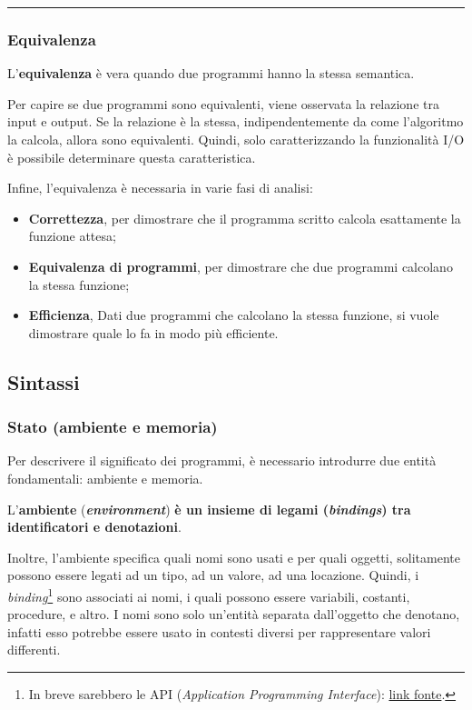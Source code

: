 \documentclass[a4paper]{article}
\newcommand{\longline}{\noindent\rule{\textwidth}{0.4pt}}
\begin{document}
	\longline
	
	\subsubsection{Equivalenza}
	
	\begin{boxdef}
		L'\textcolor{Red3}{\textbf{equivalenza}} è vera quando due programmi hanno la stessa semantica.
	\end{boxdef}
	
	\noindent
	Per capire se due programmi sono equivalenti, viene osservata la relazione tra input e output. Se la relazione è la stessa, indipendentemente da come l'algoritmo la calcola, allora sono equivalenti. Quindi, solo caratterizzando la funzionalità I/O è possibile determinare questa caratteristica.\newline
	
	\noindent
	Infine, l'equivalenza è necessaria in varie fasi di analisi:
	\begin{itemize}
		\item \textbf{Correttezza}, per dimostrare che il programma scritto calcola esattamente la funzione attesa;
		
		\item \textbf{Equivalenza di programmi}, per dimostrare che due programmi calcolano la stessa funzione;
		
		\item \textbf{Efficienza}, Dati due programmi che calcolano la stessa funzione, si vuole dimostrare quale lo fa in modo più efficiente.
	\end{itemize}\newpage
	
	\subsection{Sintassi}
	
	\subsubsection{Stato (ambiente e memoria)}
	
	Per descrivere il significato dei programmi, è necessario introdurre due entità fondamentali: ambiente e memoria.\newline
	
	\noindent
	\begin{boxdef}
		L'\textcolor{Red3}{\textbf{ambiente}} (\textbf{\emph{environment}}) \textbf{è un insieme di legami (\emph{bindings}) tra identificatori e denotazioni}.
	\end{boxdef}
	Inoltre, l'ambiente specifica quali nomi sono usati e per quali oggetti, solitamente possono essere legati ad un tipo, ad un valore, ad una locazione. Quindi, i \emph{binding}\footnote{In breve sarebbero le API (\emph{Application Programming Interface}): \href{https://en.wikipedia.org/wiki/Language_binding}{link fonte}.} sono associati ai nomi, i quali possono essere variabili, costanti, procedure, e altro. I nomi sono solo un'entità separata dall'oggetto che denotano, infatti esso potrebbe essere usato in contesti diversi per rappresentare valori differenti.\newline
	
\end{document}
